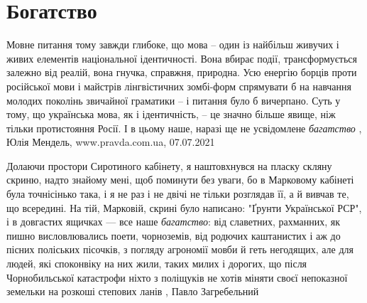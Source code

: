  
 
 
 
 
\chapter{Богатство}
\label{sec:slova.bogatstvo}

Мовне питання тому завжди глибоке, що мова – один із найбільш живучих і живих
елементів національної ідентичності. Вона вбирає події, трансформується залежно
від реалій, вона гнучка, справжня, природна. 
Усю енергію борців проти російської мови і майстрів лінгвістичних зомбі-форм
спрямувати б на навчання молодих поколінь звичайної граматики – і питання було
б вичерпано. Суть у тому, що українська мова, як і ідентичність, – це значно
більше явище, ніж тільки протистояння Росії. І в цьому наше, наразі ще не
усвідомлене \emph{багатство}
, 
Юлія Мендель, www.pravda.com.ua, 07.07.2021

Долаючи простори Сиротиного кабінету, я наштовхнувся на пласку скляну скриню,
надто знайому мені, щоб поминути без уваги, бо в Марковому кабінеті була
точнісінько така, і я не раз і не двічі не тільки розглядав її, а й вивчав те,
що всередині. На тій, Марковій, скрині було написано: "Ґрунти Української РСР",
і в довгастих ящичках — все наше \emph{багатство}: від славетних, рахманних, як пишно
висловлювались поети, чорноземів, від родючих каштанистих і аж до пісних
поліських пісочків, з погляду агрономії мовби й геть негодящих, але для людей,
які споконвіку на них жили, таких милих і дорогих, що після Чорнобильської
катастрофи ніхто з поліщуків не хотів міняти своєї непоказної земельки на
розкоші степових ланів
, Павло Загребельний 

